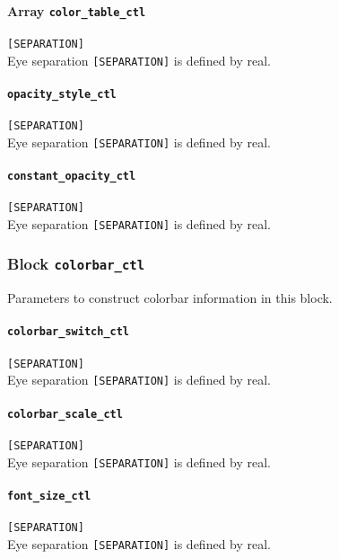 \paragraph{Array {\tt color_table_ctl}}
\label{href_t:color_table_ctl}
\verb|[SEPARATION]| \\
Eye separation \verb|[SEPARATION]| is defined by real.

\paragraph{\tt opacity_style_ctl}
\label{href_t:opacity_style_ctl}
\verb|[SEPARATION]| \\
Eye separation \verb|[SEPARATION]| is defined by real.

\paragraph{\tt constant_opacity_ctl}
\label{href_t:constant_opacity_ctl}
\verb|[SEPARATION]| \\
Eye separation \verb|[SEPARATION]| is defined by real.



\subsubsection{Block {\tt colorbar\_ctl}}
\label{href_t:colorbar_ctl}
Parameters to construct colorbar information in this block. \\

\paragraph{\tt colorbar_switch_ctl}
\label{href_t:colorbar_switch_ctl}
\verb|[SEPARATION]| \\
Eye separation \verb|[SEPARATION]| is defined by real.

\paragraph{\tt colorbar_scale_ctl}
\label{href_t:colorbar_scale_ctl}
\verb|[SEPARATION]| \\
Eye separation \verb|[SEPARATION]| is defined by real.

\paragraph{\tt font_size_ctl}
\label{href_t:font_size_ctl}
\verb|[SEPARATION]| \\
Eye separation \verb|[SEPARATION]| is defined by real.

